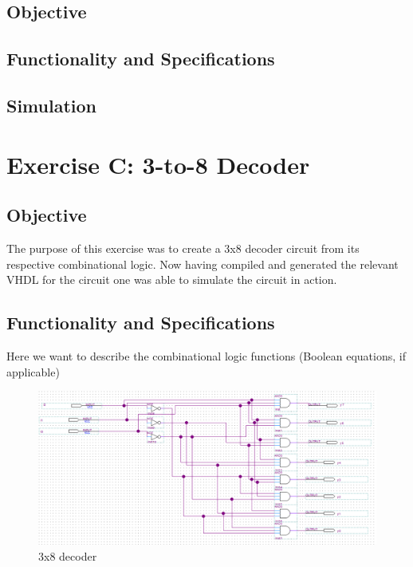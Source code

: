 \documentclass[12pt]{article}
\begin{document}
\subsection{Objective}

\subsection{Functionality and Specifications}

\subsection{Simulation}
\clearpage
\section{Exercise C: 3-to-8 Decoder}
\subsection{Objective}
The purpose of this exercise was to create a 3x8 decoder circuit from its respective combinational logic. Now having compiled and generated the relevant VHDL for the circuit one was able to simulate the circuit in action.

\subsection{Functionality and Specifications}

Here we want to describe the combinational logic functions (Boolean equations, if applicable)

\begin{figure}[h]
\caption{3x8 decoder}
\includegraphics[width=\textwidth]{./diagrams/3x8_decoder.png}
\end{figure}
\end{document}

